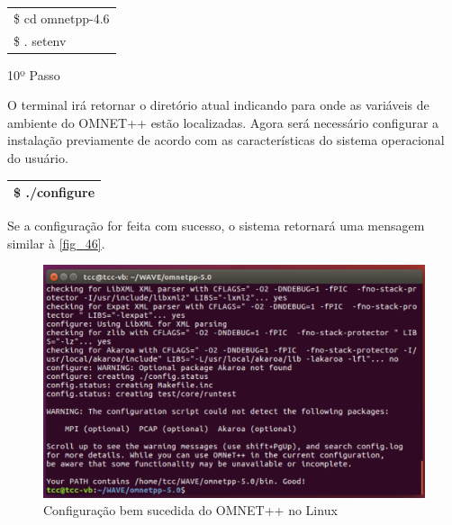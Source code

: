 \documentclass[
12pt,				%
openright,			%
oneside,			%
a4paper,			%
brazil,				%
]{abntex2}
\begin{document}
{\begin{anexosenv}
		            \begin{table}[H]
			            \renewcommand{\arraystretch}{1.5}
		                \begin{tabular}{|p{15.5cm}|}
			                \hline
                            \$ cd omnetpp-4.6 \\
                            \$ . setenv \\
			                \hline
			            \end{tabular}
		            \end{table}
                    

                	\begin{description}
		                \item[10º Passo]
		            \end{description}
		            \par O terminal irá retornar o diretório atual indicando para onde as variáveis de ambiente do OMNET++ estão localizadas. Agora será necessário configurar a instalação previamente de acordo com as características do sistema operacional do usuário.
		
		            \begin{table}[H]
			            \renewcommand{\arraystretch}{1.5}
		                \begin{tabular}{|p{15.5cm}|}
			                \hline
                            \$ ./configure \\
			                \hline
			            \end{tabular}
		            \end{table}
		            
		            \par Se a configuração for feita com sucesso, o sistema retornará uma mensagem similar à \autoref{fig_46}.
		            
	                \begin{figure} [H]
		                \centering
		                \includegraphics[scale=.4]{figuras/aneB/46InstalacaoComSucessoLinux}
		                \caption{\label{fig_46}Configuração bem sucedida do OMNET++ no Linux}
	                \end{figure}
	                

\end{anexosenv}}
\end{document}
